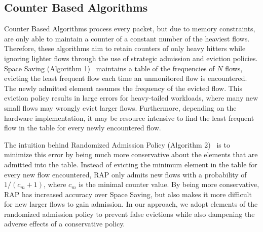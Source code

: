 \subsection{Counter Based Algorithms}
Counter Based Algorithms process every packet, but due to memory constraints, are only able to maintain a counter of a constant number of the heaviest flows. Therefore, these algorithms aim to retain counters of only heavy hitters while ignoring lighter flows through the use of strategic admission and eviction policies. Space Saving (Algorithm 1)~\cite{spacesaving} maintains a table of the frequencies of $N$ flows, evicting the least frequent flow each time an unmonitored flow is encountered. The newly admitted element assumes the frequency of the evicted flow. This eviction policy results in large errors for heavy-tailed workloads, where many new small flows may wrongly evict larger flows. Furthermore, depending on the hardware implementation, it may be resource intensive to find the least frequent flow in the table for every newly encountered flow. 

The intuition behind Randomized Admission Policy (Algorithm 2)~\cite{rap} is to minimize this error by being much more conservative about the elements that are admitted into the table. Instead of evicting the minimum element in the table for every new flow encountered, RAP only admits new flows with a probability of $1/(c_m + 1)$, where $c_m$ is the minimal counter value. By being more conservative, RAP has increased accuracy over Space Saving, but also makes it more difficult for new larger flows to gain admission. In our approach, we adopt elements of the randomized admission policy to prevent false evictions while also dampening the adverse effects of a conservative policy. 

